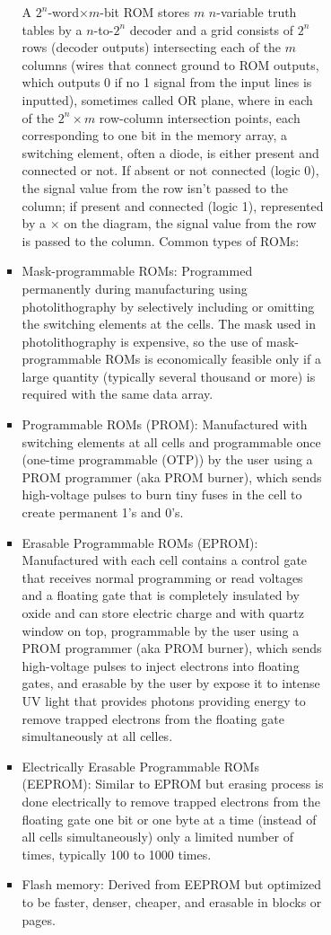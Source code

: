 \documentclass[a4paper,12pt]{article}
\begin{document}
\begin{itemize}
\begin{itemize}
\begin{itemize}
\begin{itemize}
\begin{itemize}
\begin{itemize}
\begin{itemize}
A $2^n$-word$\times m$-bit ROM stores $m$ $n$-variable truth tables by a $n$-to-$2^n$ decoder and a grid consists of $2^n$ rows (decoder outputs) intersecting each of the $m$ columns (wires that connect ground to ROM outputs, which outputs 0 if no 1 signal from the input lines is inputted), sometimes called OR plane, where in each of the $2^n\times m$ row-column intersection points, each corresponding to one bit in the memory array, a switching element, often a diode, is either present and connected or not. If absent or not connected (logic 0), the signal value from the row isn't passed to the column; if present and connected (logic 1), represented by a $\times$ on the diagram, the signal value from the row is passed to the column.
Common types of ROMs:
\bit
\item Mask-programmable ROMs: Programmed permanently during manufacturing using photolithography by selectively including or omitting the switching elements at the cells. The mask used in photolithography is expensive, so the use of mask-programmable ROMs is economically feasible only if a large quantity (typically several thousand or more) is required with the same data array.
\item Programmable ROMs (PROM): Manufactured with switching elements at all cells and programmable once (one-time programmable (OTP)) by the user using a PROM programmer (aka PROM burner), which sends high-voltage pulses to burn tiny fuses in the cell to create permanent 1's and 0's.
\item Erasable Programmable ROMs (EPROM): Manufactured with each cell contains a control gate that receives normal programming or read voltages and a floating gate that is completely insulated by oxide and can store electric charge and with quartz window on top, programmable by the user using a PROM programmer (aka PROM burner), which sends high-voltage pulses to inject electrons into floating gates, and erasable by the user by expose it to intense UV light that provides photons providing energy to remove trapped electrons from the floating gate simultaneously at all celles.
\item Electrically Erasable Programmable ROMs (EEPROM): Similar to EPROM but erasing process is done electrically to remove trapped electrons from the floating gate one bit or one byte at a time (instead of all cells simultaneously) only a limited number of times, typically 100 to 1000 times.
\item Flash memory: Derived from EEPROM but optimized to be faster, denser, cheaper, and erasable in blocks or pages.


\end{itemize}
\end{itemize}
\end{itemize}
\end{itemize}
\end{itemize}
\end{itemize}
\end{itemize}
\end{document}

